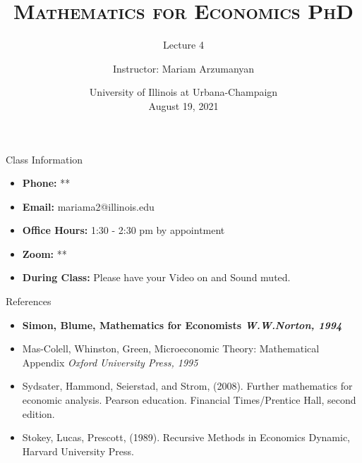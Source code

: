 \documentclass{beamer}
\title{\textsc{Mathematics for Economics PhD}}
\subtitle{Lecture 4}
\author{Instructor:  Mariam Arzumanyan}
\date[UIUC, Fall 2021]{University of Illinois at Urbana-Champaign \\August 19, 2021 }
\begin{document}
\begin{frame}
  \titlepage
\end{frame}


\begin{frame}{Class Information}
\begin{itemize}
  
    \item \textbf{Phone:} **
    \item \textbf{Email:} mariama2@illinois.edu
\item \textbf{Office Hours:}  1:30 - 2:30 pm  by appointment
\item \textbf{Zoom: }**
\item \textbf{During Class:} Please have your Video on and Sound muted. 

\end{itemize}

\end{frame}
\begin{frame}{References}
	\begin{itemize}

\item	\textbf{Simon, Blume, Mathematics for Economists \textit{W.W.Norton, 1994}}
\item	Mas-Colell, Whinston, Green, Microeconomic Theory: Mathematical Appendix \textit{Oxford University Press,  1995 }
\item		Sydsater, Hammond, Seierstad, and Strom, (2008). Further mathematics for economic analysis. Pearson education. Financial Times/Prentice Hall, second edition.
\item		Stokey, Lucas, Prescott, (1989). Recursive Methods in Economics Dynamic, Harvard University Press.

 \end{itemize}   
\end{frame}
\end{document}
